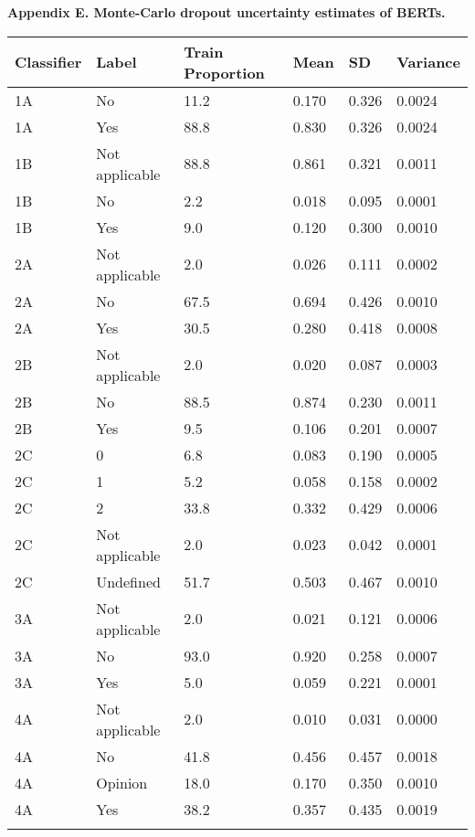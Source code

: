 \documentclass[11pt]{article}
\begin{document}
\noindent\hspace*{1cm}\textbf{\large Appendix E. Monte-Carlo dropout uncertainty estimates of BERTs.}

\vspace{1em}

{\small
\renewcommand{\arraystretch}{1.2}
\begin{tabular}{p{2.2cm} p{2.8cm} p{2.2cm} p{1.6cm} p{1.6cm} p{2.0cm}}
\toprule
\textbf{Classifier} & \textbf{Label} & \textbf{Train Proportion} & \textbf{Mean} & \textbf{SD} & \textbf{Variance} \\
\midrule
1A & No & 11.2 & 0.170 & 0.326 & 0.0024 \\
\addlinespace[0.6em]
1A & Yes & 88.8 & 0.830 & 0.326 & 0.0024 \\
\addlinespace[0.6em]
1B & Not applicable & 88.8 & 0.861 & 0.321 & 0.0011 \\
\addlinespace[0.6em]
1B & No & 2.2 & 0.018 & 0.095 & 0.0001 \\
\addlinespace[0.6em]
1B & Yes & 9.0 & 0.120 & 0.300 & 0.0010 \\
\addlinespace[0.6em]
2A & Not applicable & 2.0 & 0.026 & 0.111 & 0.0002 \\
\addlinespace[0.6em]
2A & No & 67.5 & 0.694 & 0.426 & 0.0010 \\
\addlinespace[0.6em]
2A & Yes & 30.5 & 0.280 & 0.418 & 0.0008 \\
\addlinespace[0.6em]
2B & Not applicable & 2.0 & 0.020 & 0.087 & 0.0003 \\
\addlinespace[0.6em]
2B & No & 88.5 & 0.874 & 0.230 & 0.0011 \\
\addlinespace[0.6em]
2B & Yes & 9.5 & 0.106 & 0.201 & 0.0007 \\
\addlinespace[0.6em]
2C & 0 & 6.8 & 0.083 & 0.190 & 0.0005 \\
\addlinespace[0.6em]
2C & 1 & 5.2 & 0.058 & 0.158 & 0.0002 \\
\addlinespace[0.6em]
2C & 2 & 33.8 & 0.332 & 0.429 & 0.0006 \\
\addlinespace[0.6em]
2C & Not applicable & 2.0 & 0.023 & 0.042 & 0.0001 \\
\addlinespace[0.6em]
2C & Undefined & 51.7 & 0.503 & 0.467 & 0.0010 \\
\addlinespace[0.6em]
3A & Not applicable & 2.0 & 0.021 & 0.121 & 0.0006 \\
\addlinespace[0.6em]
3A & No & 93.0 & 0.920 & 0.258 & 0.0007 \\
\addlinespace[0.6em]
3A & Yes & 5.0 & 0.059 & 0.221 & 0.0001 \\
\addlinespace[0.6em]
4A & Not applicable & 2.0 & 0.010 & 0.031 & 0.0000 \\
\addlinespace[0.6em]
4A & No & 41.8 & 0.456 & 0.457 & 0.0018 \\
\addlinespace[0.6em]
4A & Opinion & 18.0 & 0.170 & 0.350 & 0.0010 \\
\addlinespace[0.6em]
4A & Yes & 38.2 & 0.357 & 0.435 & 0.0019 \\
\addlinespace[0.6em]
\bottomrule
\end{tabular}

}
\end{document}

